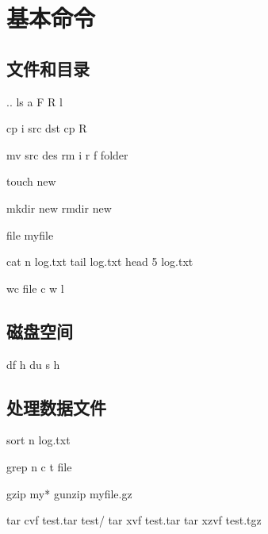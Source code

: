 \documentclass[letterpaper,10pt,english]{sphinxmanual}
\begin{document}
\section{基本命令}
\label{\detokenize{linux/01_basic::doc}}\label{\detokenize{linux/01_basic:id1}}

\subsection{文件和目录}
\label{\detokenize{linux/01_basic:id2}}
%
\begin{sphinxVerbatim}[commandchars=\\\{\}]
 ..
ls \PYGZhy{}a \PYGZhy{}F \PYGZhy{}R \PYGZhy{}l

cp \PYG{o}{[}\PYGZhy{}i\PYG{o}{]} src dst
cp \PYGZhy{}R

mv src des
rm \PYGZhy{}i \PYGZhy{}r \PYGZhy{}f folder

touch new 

mkdir new
rmdir new

file my\PYGZus{}file 

cat \PYGZhy{}n log.txt
tail log.txt
head \PYGZhy{}5 log.txt

wc file \PYGZhy{}c \PYGZhy{}w \PYGZhy{}l
\end{sphinxVerbatim}


\subsection{磁盘空间}
\label{\detokenize{linux/01_basic:id3}}
%
\begin{sphinxVerbatim}[commandchars=\\\{\}]
df \PYGZhy{}h
du \PYG{o}{[}\PYGZhy{}s\PYG{o}{]} \PYGZhy{}h
\end{sphinxVerbatim}


\subsection{处理数据文件}
\label{\detokenize{linux/01_basic:id4}}
%
\begin{sphinxVerbatim}[commandchars=\\\{\}]
sort \PYG{o}{[}\PYGZhy{}n\PYG{o}{]} log.txt 

grep \PYG{o}{[}\PYGZhy{}n\PYG{o}{]} \PYG{o}{[}\PYGZhy{}c\PYG{o}{]} t file 

gzip my*
gunzip myfile.gz

tar \PYGZhy{}cvf test.tar test/
tar \PYGZhy{}xvf test.tar
tar \PYGZhy{}xzvf test.tgz
\end{sphinxVerbatim}
\end{document}
